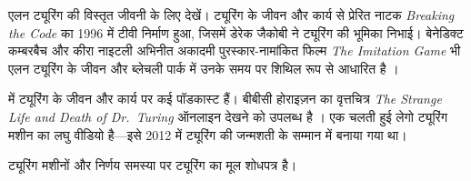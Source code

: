 \documentclass[../../../include/open-logic-section]{subfiles}
\begin{document}
\begin{reading}
एलन ट्यूरिंग की विस्तृत जीवनी के लिए \citet{Hodges2014} देखें। ट्यूरिंग के
जीवन और कार्य से प्रेरित नाटक \emph{Breaking the Code} का 1996 में टीवी
निर्माण हुआ, जिसमें डेरेक जैकोबी ने ट्यूरिंग की भूमिका निभाई। बेनेडिक्ट
कम्बरबैच और कीरा नाइटली अभिनीत अकादमी पुरस्कार-नामांकित फिल्म \emph{The
Imitation Game} भी एलन ट्यूरिंग के जीवन और ब्लेचली पार्क में उनके समय पर
शिथिल रूप से आधारित है \citep{Imitation2014}।

\citet{Radiolab2012} में ट्यूरिंग के जीवन और कार्य पर कई पॉडकास्ट हैं। बीबीसी
होराइज़न का वृत्तचित्र \emph{The Strange Life and Death of Dr.~Turing}
ऑनलाइन देखने को उपलब्ध है \citep{Sykes1992}। \citet{Theelen2012} एक चलती
हुई लेगो ट्यूरिंग मशीन का लघु वीडियो है---इसे 2012 में ट्यूरिंग की जन्मशती
के सम्मान में बनाया गया था।

ट्यूरिंग मशीनों और निर्णय समस्या पर ट्यूरिंग का मूल शोधपत्र
\citet{Turing1937} है।
\end{reading}
\end{document}
